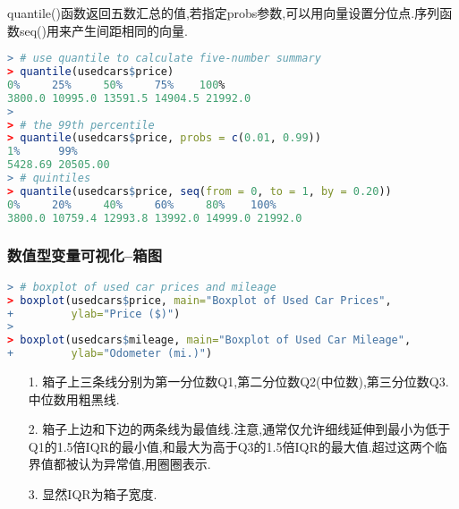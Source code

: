 \documentclass[11pt,a4paper,oneside]{book}
\begin{document}
quantile()函数返回五数汇总的值,若指定probs参数,可以用向量设置分位点.序列函数seq()用来产生间距相同的向量.
\begin{lstlisting}[language=r]
> # use quantile to calculate five-number summary
> quantile(usedcars$price)
0%     25%     50%     75%    100% 
3800.0 10995.0 13591.5 14904.5 21992.0 
> 
> # the 99th percentile
> quantile(usedcars$price, probs = c(0.01, 0.99))
1%      99% 
5428.69 20505.00 
> # quintiles
> quantile(usedcars$price, seq(from = 0, to = 1, by = 0.20))
0%     20%     40%     60%     80%    100% 
3800.0 10759.4 12993.8 13992.0 14999.0 21992.0 
\end{lstlisting}

\subsubsection{数值型变量可视化--箱图}
\begin{lstlisting}[language=r]
> # boxplot of used car prices and mileage
> boxplot(usedcars$price, main="Boxplot of Used Car Prices",
+         ylab="Price ($)")
> 
> boxplot(usedcars$mileage, main="Boxplot of Used Car Mileage",
+         ylab="Odometer (mi.)")
\end{lstlisting}

\begin{figure}[H]
	\centering
\end{figure}

\begin{tcolorbox}[colback=pink!10!white,colframe=pink!100!black]
\begin{enumerate}
	\item[1.]箱子上三条线分别为第一分位数Q1,第二分位数Q2(中位数),第三分位数Q3.中位数用粗黑线.
	\item[2.]箱子上边和下边的两条线为最值线.注意,通常仅允许细线延伸到最小为低于Q1的1.5倍IQR的最小值,和最大为高于Q3的1.5倍IQR的最大值.超过这两个临界值都被认为异常值,用圈圈表示.
	\item[3.]显然IQR为箱子宽度.
\end{enumerate} 
\end{tcolorbox}
\end{document}

